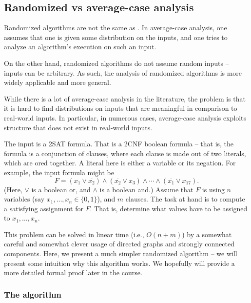 \subsection{Randomized vs average-case analysis}

Randomized algorithms are not the same as . In average-case analysis, one assumes that one is given some
distribution on the inputs, and one tries to analyze an algorithm's
execution on such an input. 

On the other hand, randomized algorithms do not assume random inputs
-- inputs can be arbitrary. As such, the analysis of randomized algorithms is
more widely applicable and more general.

While there is a lot of average-case analysis in the literature, the
problem is that it is hard to find distributions on inputs that are
meaningful in comparison to real-world inputs. In particular, in
numerous cases, average-case analysis exploits structure that does
not exist in real-world inputs.




The input is a 2SAT formula. That is a 2CNF boolean formula -- that
is, the formula is a conjunction of clauses, where each clause is made
out of two literals, which are \si{or}ed together. A literal here is
either a variable or its negation. For example, the input formula
might be
\begin{equation*}
    F = (x_1 \vee \overline{x_2} ) \wedge
    (\overline{x_2} \vee x_3) \wedge \cdots
    \wedge
    (\overline{x_1} \vee x_{17}).
\end{equation*}
(Here, $\vee$ is a boolean or, and $\wedge$ is a boolean and.) Assume
that $F$ is using $n$ variables (say $x_1, \ldots, x_n \in \{0,1\}$),
and $m$ clauses. The task at hand is to compute a satisfying
assignment for $F$. That is, determine what values have to be assigned
to $x_1,\ldots, x_n$.

This problem can be solved in linear time (i.e., $O(n+m)$) by a
somewhat careful and somewhat clever usage of directed graphs and
strongly connected components. Here, we present a much simpler
randomized algorithm -- we will present some intuition why this
algorithm works. We hopefully will provide a more detailed formal
proof later in the course.


\subsubsection{The algorithm}

